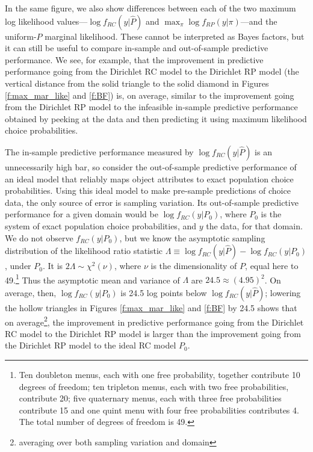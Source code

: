 \documentclass[11pt,letter]{article}
\newcommand{\Dpi}{Dirichlet RP model}
\newcommand{\DP}{Dirichlet RC model}
\begin{document}
In the same figure, we also show differences between each of the two maximum log likelihood values---$\log f_{RC}(y|\hat{P})$ and $\max_{\pi} \log f_{RP}(y|\pi)$---and the uniform-$P$ marginal likelihood.
These cannot be interpreted as Bayes factors, but it can still be useful to compare in-sample and out-of-sample predictive performance.
We see, for example, that the improvement in predictive performance going from the \DP{} to the \Dpi{} (the vertical distance from the solid triangle to the solid diamond in Figures \ref{f:max_mar_like} and \ref{f:BF}) is, on average, similar to the improvement going from the \Dpi{} to the infeasible in-sample predictive performance obtained by peeking at the data and then predicting it using maximum likelihood choice probabilities.

The in-sample predictive performance measured by $\log f_{RC}(y|\hat{P})$ is an unnecessarily high bar, so consider the out-of-sample predictive performance of an ideal model that reliably maps object attributes to exact population choice probabilities.
Using this ideal model to make pre-sample predictions of choice data, the only source of error is sampling variation.
Its out-of-sample predictive performance for a given domain would be $\log f_{RC}(y|P_0)$, where $P_0$ is the system of exact population choice probabilities, and $y$ the data, for that domain.
We do not observe $f_{RC}(y|P_0)$, but we know the asymptotic sampling distribution of the likelihood ratio statistic $\Lambda \equiv \log f_{RC}(y|\hat{P}) - \log f_{RC}(y|P_0)$, under $P_0$.
It is $2\Lambda \sim \chi^2(\nu)$, where $\nu$ is the dimensionality of $P$, equal here to 49.\footnote{Ten doubleton menus, each with one free probability, together contribute 10 degrees of freedom; ten tripleton menus, each with two free probabilities, contribute 20; five quaternary menus, each with three free probabilities contribute 15 and one quint menu with four free probabilities contributes 4. The total number of degrees of freedom is 49.}
Thus the asymptotic mean and variance of $\Lambda$ are $24.5 \approx (4.95)^2$.
On average, then, $\log f_{RC}(y|P_0)$ is 24.5 log points below $\log f_{RC}(y|\hat{P})$; lowering the hollow triangles in Figures \ref{f:max_mar_like} and \ref{f:BF} by 24.5 shows that on average\footnote{averaging over both sampling variation and domain}, the improvement in predictive performance going from the \DP{} to the \Dpi{} is larger than the improvement going from the \Dpi{} to the ideal RC model $P_0$.
\end{document}
